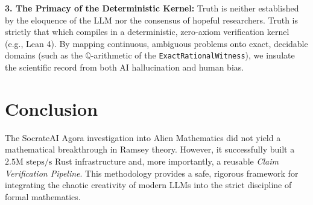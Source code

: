 \documentclass[11pt,a4paper]{article}
\begin{document}
\textbf{3. The Primacy of the Deterministic Kernel:} Truth is neither established by the eloquence of the LLM nor the consensus of hopeful researchers. Truth is strictly that which compiles in a deterministic, zero-axiom verification kernel (e.g., Lean 4). By mapping continuous, ambiguous problems onto exact, decidable domains (such as the $\mathbb{Q}$-arithmetic of the \texttt{ExactRationalWitness}), we insulate the scientific record from both AI hallucination and human bias.

\section{Conclusion}

The SocrateAI Agora investigation into Alien Mathematics did not yield a mathematical breakthrough in Ramsey theory. However, it successfully built a $2.5 \text{M steps/s}$ Rust infrastructure and, more importantly, a reusable \textit{Claim Verification Pipeline}. This methodology provides a safe, rigorous framework for integrating the chaotic creativity of modern LLMs into the strict discipline of formal mathematics.
\end{document}
